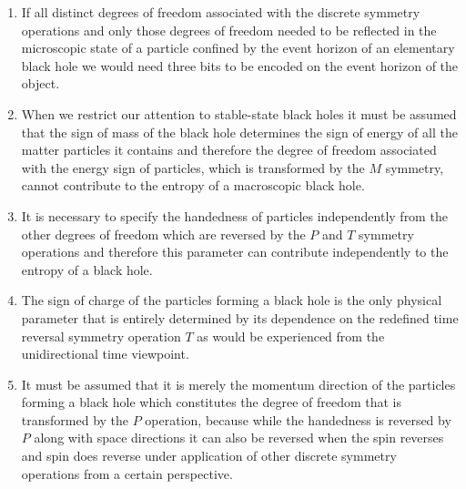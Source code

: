 \documentclass[notitlepage,12pt]{report}
\begin{document}
\begin{enumerate}
\item If all distinct degrees of freedom associated with the discrete symmetry operations and only those degrees of freedom needed to be reflected in the microscopic state of a particle confined by the event horizon of an elementary black hole we would need three bits to be encoded on the event horizon of the object.

\item When we restrict our attention to stable-state black holes it must be assumed that the sign of mass of the black hole determines the sign of energy of all the matter particles it contains and therefore the degree of freedom associated with the energy sign of particles, which is transformed by the $M$ symmetry, cannot contribute to the entropy of a macroscopic black hole.

\item It is necessary to specify the handedness of particles independently from the other degrees of freedom which are reversed by the $P$ and $T$ symmetry operations and therefore this parameter can contribute independently to the entropy of a black hole.

\item The sign of charge of the particles forming a black hole is the only physical parameter that is entirely determined by its dependence on the redefined time reversal symmetry operation $T$ as would be experienced from the unidirectional time viewpoint.

\item It must be assumed that it is merely the momentum direction of the particles forming a black hole which constitutes the degree of freedom that is transformed by the $P$ operation, because while the handedness is reversed by $P$ along with space directions it can also be reversed when the spin reverses and spin does reverse under application of other discrete symmetry operations from a certain perspective.


\end{enumerate}
\end{document}
